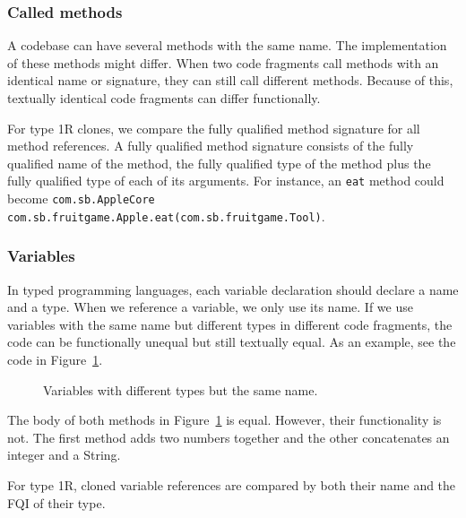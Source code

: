 \subsubsection{Called methods}
A codebase can have several methods with the same name. The implementation of these methods might differ. When two code fragments call methods with an identical name or signature, they can still call different methods. Because of this, textually identical code fragments can differ functionally.

For type 1R clones, we compare the fully qualified method signature for all method references. A fully qualified method signature consists of the fully qualified name of the method, the fully qualified type of the method plus the fully qualified type of each of its arguments. For instance, an \texttt{eat} method could become \texttt{com.sb.AppleCore com.sb.fruitgame.Apple.eat(com.sb.fruitgame.Tool)}.

\subsubsection{Variables}
In typed programming languages, each variable declaration should declare a name and a type. When we reference a variable, we only use its name. If we use variables with the same name but different types in different code fragments, the code can be functionally unequal but still textually equal. As an example, see the code in Figure~\ref{fig:type2variables}.

\begin{figure}[H]
\begin{parcolumns}{2}
\end{parcolumns}
\caption{Variables with different types but the same name.}
\label{fig:type2variables}
\end{figure}

The body of both methods in Figure~\ref{fig:type2variables} is equal. However, their functionality is not. The first method adds two numbers together and the other concatenates an integer and a String.

For type 1R, cloned variable references are compared by both their name and the FQI of their type.

